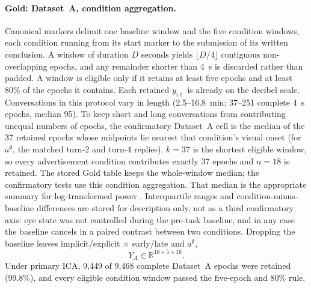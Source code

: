 \documentclass[english]{article}
\begin{document}
\paragraph{Gold: Dataset~A, condition aggregation.}
Canonical markers delimit one baseline window and the five condition windows, each condition running from its start marker to the submission of its written conclusion. A window of duration \(D\) seconds yields \(\lfloor D/4\rfloor\) contiguous non-overlapping epochs, and any remainder shorter than 4~s is discarded rather than padded. A window is eligible only if it retains at least five epochs and at least 80\% of the epochs it contains. Each retained \(y_{i\ell}\) is already on the decibel scale. Conversations in this protocol vary in length (2.5--16.8~min; 37--251 complete 4~s epochs, median 95). To keep short and long conversations from contributing unequal numbers of epochs, the confirmatory Dataset~A cell is the median of the 37 retained epochs whose midpoints lie nearest that condition's visual onset (for \(a^{\emptyset}\), the matched turn-2 and turn-4 replies). \(k=37\) is the shortest eligible window, so every advertisement condition contributes exactly 37 epochs and \(n=18\) is retained. The stored Gold table keeps the whole-window median; the confirmatory tests use this condition aggregation. That median is the appropriate summary for log-transformed power \cite{smulders2018log}. Interquartile ranges and condition-minus-baseline differences are stored for description only, not as a third confirmatory axis: eye state was not controlled during the pre-task baseline, and in any case the baseline cancels in a paired contrast between two conditions. Dropping the baseline leaves implicit/explicit \(\times\) early/late and \(a^{\emptyset}\),
\begin{equation}
Y_A\in\mathbb{R}^{18\times 5\times 16}.
\end{equation}
Under primary ICA, 9{,}449 of 9{,}468 complete Dataset~A epochs were retained (99.8\%), and every eligible condition window passed the five-epoch and 80\% rule.
\end{document}
